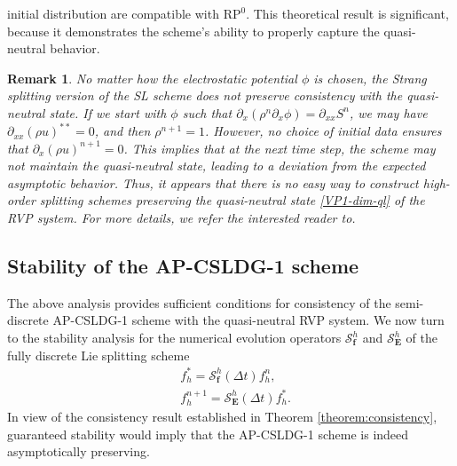 \documentclass[letterpaper,10pt]{article}
\newtheorem{remark}{Remark}[section]
\numberwithin{equation}{section}
\numberwithin{figure}{section}
\numberwithin{table}{section}
\begin{document}
initial distribution are compatible with $\text{RP}^0$. This theoretical
result is significant, because it demonstrates the scheme's ability to properly capture the quasi-neutral behavior.
\begin{remark}
No matter how the electrostatic potential $\phi$ is chosen, the Strang splitting
version of the SL scheme does not preserve consistency with the quasi-neutral state.
If we start with $\phi$ such that $\partial_x(\rho^n\partial_x\phi)=\partial_{xx}S^n$, we may have $\partial_{xx}(\rho u)^{**}=0$, and then $\rho^{n+1}=1$. However,
no choice of initial data ensures that $\partial_x(\rho u)^{n+1}=0$.
    This implies that at the next time step, the scheme may not maintain the quasi-neutral state, leading to a deviation from the expected asymptotic behavior.
    Thus, it appears that there is no easy way to construct high-order
    splitting schemes preserving the quasi-neutral state \eqref{VP1-dim-ql} of the RVP system. For more details, we refer the interested reader to\cite{Crou2016}.
\end{remark}

\subsection{Stability of the AP-CSLDG-1 scheme}

The above analysis provides sufficient conditions for consistency
of the semi-discrete AP-CSLDG-1 scheme with the quasi-neutral RVP system. 
We now turn to the stability analysis for the numerical evolution operators $\mathcal{S}_{\mathbf{f}}^h$
and $\mathcal{S}_{\mathbf{E}}^h$ of the fully discrete Lie splitting scheme
\begin{align*}
    &f_h^*=\mathcal{S}_{\mathbf{f}}^h(\Delta t)f_h^n,\\
    &f_h^{n+1}=\mathcal{S}_{\mathbf{E}}^h(\Delta t)f_h^*.
\end{align*}
In view of the consistency result established in Theorem \ref{theorem:consistency},
guaranteed stability would imply that the AP-CSLDG-1 scheme is indeed asymptotically
preserving.
\end{document}
